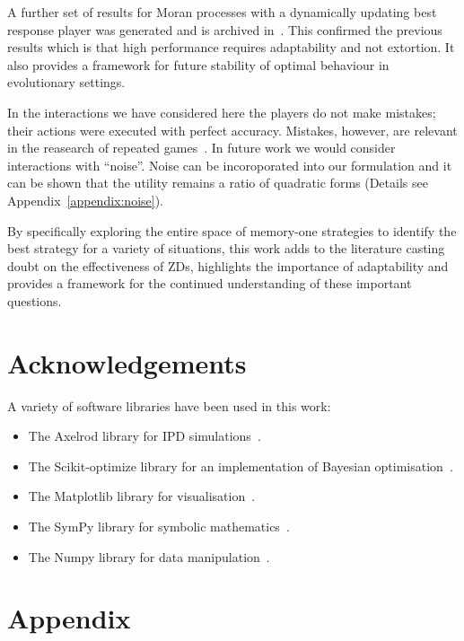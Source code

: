 \documentclass[10pt]{article}
\begin{document}
A further set of results for Moran processes with a dynamically updating best
response player was generated and is archived in~\cite{}. %
This confirmed the previous results which is that high performance
requires adaptability and not extortion. It also provides a framework for future
stability of optimal behaviour in evolutionary settings.

In the interactions we have considered here the players do not make mistakes; their
actions were executed with perfect accuracy. Mistakes, however, are relevant in
the reasearch of repeated games~\cite{Boyd1989, Imhof2007, Nowak1993, Wu1995}. In
future work we would consider interactions with ``noise''. Noise can be
incoroporated into our formulation and it can be shown that the utility remains a ratio
of quadratic forms (Details see Appendix~\ref{appendix:noise}).

By specifically exploring the entire space of memory-one strategies to identify
the best strategy for a variety of situations, this work adds to the literature
casting doubt
on the effectiveness of ZDs, highlights the importance of adaptability and provides
a framework for the continued understanding of these important questions.

\section{Acknowledgements}

A variety of software libraries have been used in this work:

\begin{itemize}
    \item The Axelrod library for IPD simulations~\cite{axelrodproject}.
    \item The Scikit-optimize library for an implementation of Bayesian optimisation~\cite{tim_head_2018_1207017}.
    \item The Matplotlib library for visualisation~\cite{hunter2007matplotlib}.
    \item The SymPy library for symbolic mathematics~\cite{sympy}.
    \item The Numpy library for data manipulation~\cite{walt2011numpy}.
\end{itemize}




\section{Appendix}
\end{document}
